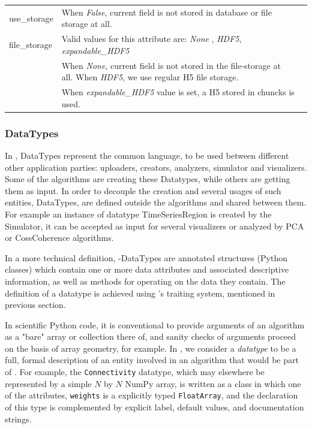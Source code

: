 \begin{center}
\begin{table}[ht]
\begin{tabularx}{\textwidth}{lll}
		use\_storage	& When \emph{False}, current field is not stored in database or file storage at all. \\
		file\_storage	& Valid values for this attribute are: \emph{None} , \emph{HDF5}, \emph{expandable\_HDF5} \\
					& When \emph{None}, current field is not stored in the file-storage at all. When \emph{HDF5}, we use regular H5 file storage. \\
					& When \emph{expandable\_HDF5} value is set, a H5 stored in chuncks is used. \\
		\bottomrule
    	\end{tabularx}
	\end{table}
\end{center}


	\subsubsection{DataTypes}

In \TVB, DataTypes represent the common language, to be used between different other application parties: 
uploaders, creators, analyzers, simulator and visualizers.
Some of the algorithms are creating these Datatypes, while others are getting them as input. 
In order to decouple the creation and several usages of such entities, DataTypes, are defined outside the algorithms 
and shared between them. For example an instance of datatype TimeSeriesRegion is created by the Simulator, 
it can be accepted as input for several visualizers or analyzed by PCA or CossCoherence algorithms.

In a more technical definition, \TVB-DataTypes are annotated structures (Python classes) which
contain one or more data attributes and associated descriptive information, as
well as methods for operating on the data they contain. The definition of a
datatype is achieved using \TVB's traiting system, mentioned in previous section.

In scientific Python code, it is conventional to provide arguments
of an algorithm as a "bare" array or collection there of, and sanity
checks of arguments proceed on the basis of array geometry, for example.
In \TVB, we consider a \textit{datatype} to be a full, formal description of 
an entity involved in an algorithm that would be part of \TVB. 
For example, the \texttt{Connectivity} datatype, which may elsewhere
be represented by a simple $N$ by $N$ NumPy array, is written as a class
in which one of the attributes, \texttt{weights} is a explicitly typed 
\texttt{FloatArray}, and the declaration of this type is complemented by
explicit label, default values, and documentation strings. 

